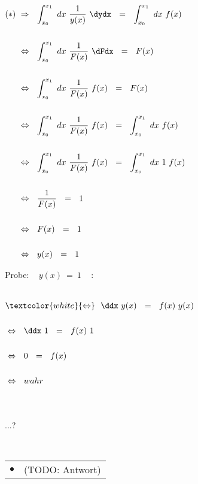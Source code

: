 \begin{enumerate}
	$\begin{aligned}[t]
	(*) ~ &\Rightarrow ~~ \int_{x_0}^{x_1} ~ dx ~ \frac{1}{y(x)} ~ \dydx ~~ = ~~ \int_{x_0}^{x_1} ~ dx ~ f(x) \\ \\
	&\Leftrightarrow ~~ \int_{x_0}^{x_1} ~ dx ~ \frac{1}{F(x)} ~ \dFdx ~~ = ~~ F(x) \\ \\
	&\Leftrightarrow ~~ \int_{x_0}^{x_1} ~ dx ~ \frac{1}{F(x)} ~ f(x) ~~ = ~~ F(x) \\ \\
	&\Leftrightarrow ~~ \int_{x_0}^{x_1} ~ dx ~ \frac{1}{F(x)} ~ f(x) ~~ = ~~ \int_{x_0}^{x_1} ~ dx ~ f(x) \\ \\
	&\Leftrightarrow ~~ \int_{x_0}^{x_1} ~ dx ~ \frac{1}{F(x)} ~ f(x) ~~ = ~~ \int_{x_0}^{x_1} ~ dx ~ 1 ~ f(x) \\ \\
	&\Leftrightarrow ~~ \frac{1}{F(x)} ~~ = ~~ 1\\ \\
	&\Leftrightarrow ~~ F(x) ~~ = ~~ 1 \\ \\
	&\Leftrightarrow ~~ y(x) ~~ = ~~ 1
	\end{aligned}$
	
	
	\newpage
	
	
	Probe: ~ $y(x) ~ = ~ 1$ ~ :
	
	~\\
	
	$\begin{aligned}[t]
	&\textcolor{white}{\Leftrightarrow} ~~ \ddx ~ y(x) ~~ = ~~ f(x) ~  y(x) \\ \\
	&\Leftrightarrow ~~ \ddx ~ 1 ~~ = ~~ f(x) ~  1 \\ \\
	&\Leftrightarrow ~~ 0 ~~ = ~~ f(x) \\ \\
	&\Leftrightarrow ~~ wahr
	\end{aligned}$
	
	~\\
	~\\
	
	...?
	
	~\\
	
	\begin{tabularx}{0.88\textwidth}{lX}
		$\bullet$ & (TODO: Antwort)
	\end{tabularx}
	
	~\\

	
	
\end{enumerate}





